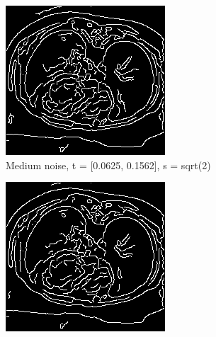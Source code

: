 \begin{figure}[H]
  \centering
  
  \begin{subfigure}{.5\textwidth}
    \centering
    \includegraphics[width=.9\textwidth]{./edgedetection/medium_noise/m_noise_def}
    \caption{Medium noise, t = [0.0625, 0.1562], s = sqrt(2)}
    \label{fig:m_noise_def}
  \end{subfigure}%
      \begin{subfigure}{.5\textwidth}
    \centering
    \includegraphics[width=.9\textwidth]{./edgedetection/medium_noise/m_noise_insens_l_thres}

\end{subfigure}
\end{figure}
